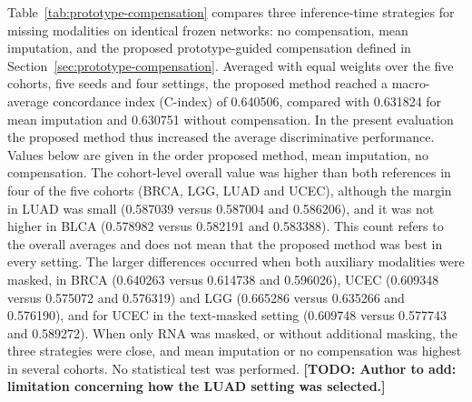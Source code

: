 \documentclass[pdflatex,sn-vancouver-num]{sn-jnl}
\newcommand{\TODO}[1]{\textbf{[TODO: #1]}}
\begin{document}
Table~\ref{tab:prototype-compensation} compares three inference-time
strategies for missing modalities on identical frozen networks: no
compensation, mean imputation, and the proposed prototype-guided compensation
defined in Section~\ref{sec:prototype-compensation}. Averaged with equal
weights over the five cohorts, five seeds and four settings,
the proposed method reached a macro-average concordance index (C-index)
of 0.640506, compared with 0.631824 for mean imputation and 0.630751 without
compensation. In the present evaluation the proposed method thus increased
the average discriminative performance. Values below are given in the order
proposed method, mean imputation, no compensation. The cohort-level overall
value was higher than both references in four of the five cohorts (BRCA, LGG,
LUAD and UCEC), although the margin in LUAD
was small (0.587039 versus 0.587004 and 0.586206), and it was not higher in
BLCA (0.578982 versus 0.582191 and 0.583388). This count refers to the overall
averages and does not mean that the proposed method was best in every setting.
The larger differences occurred when both auxiliary modalities were masked, in
BRCA (0.640263 versus 0.614738 and 0.596026), UCEC (0.609348 versus 0.575072
and 0.576319) and LGG (0.665286 versus 0.635266 and 0.576190), and for UCEC in
the text-masked setting (0.609748 versus 0.577743 and 0.589272). When only RNA
was masked, or without additional masking, the three strategies were close,
and mean imputation or no compensation was highest in several cohorts. No
statistical test was performed.
\TODO{Author to add: limitation concerning how the LUAD setting was selected.}
\end{document}
